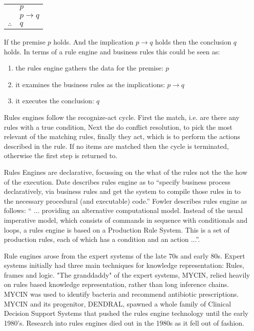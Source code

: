 \begin{tabular}{c@{\,}l@{}} 
    & $p$ \\
\arrayrulecolor{blue!60!green!70}    & $p \to q$ \\\cline{2-2}
$\therefore$         & $q$ \\
\end{tabular}

If the premise $p$ holds. And the implication $p \to q$ holds then the conclusion $q$ holds. 
In terms of a rule engine and business rules this could be seen as:
\begin{enumerate}
    \item the rules engine gathers the data for the premise: $p$
    \item it examines the business rules as the implications: $p \to q$
    \item it executes the conclusion: $q$
\end{enumerate}

Rules engines follow the recognize-act cycle.  First the match, i.e. are there any rules with a true condition, Next the do conflict resolution, to pick the most relevant of the matching rules, finally they act, which is to perform the actions described in the rule.
If no items are matched then the cycle is terminated, otherwise the first step is returned to.

Rules Engines are declarative, focussing on the what of the rules not the the how of the execution.
Date\cite{date2000not} describes rules engine as to ``specify business process declaratively, via business rules and get the system to compile those rules in to the necessary procedural (and executable) code.''
Fowler\cite{Fowler_rulesEngine} describes rules engine as follows: `` ... providing an alternative computational model.
Instead of the usual imperative model, which consists of commands in sequence with conditionals and loops, a rules engine is based on a Production Rule System.
This is a set of production rules, each of which has a condition and an action ...''.

Rule engines arose from the expert systems of the late 70s and early 80s. 
Expert systems initially had three main techniques for knowledge representation: Rules, frames and logic\cite{jackson1986introduction}.  
"The granddaddy" of the expert systems, MYCIN, relied heavily on rules based knowledge representation\cite{shortliffe1974mycin}, rather than long inference chains.
MYCIN was used to identify bacteria and recommend antibiotic prescriptions.
MYCIN and its progenitor, DENDRAL, spawned a whole family of Clinical Decision Support Systems that pushed the rules engine technology until the early 1980's.
Research into rules engines died out in the 1980s as it fell out of fashion.

